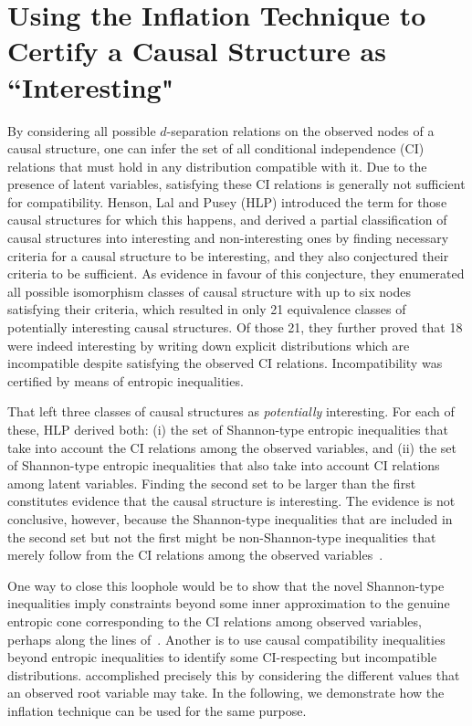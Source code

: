 \documentclass[aps,english,10pt,superscriptaddress,onecolumn,twoside,longbibliography,pra,floatfix,fleqn,nofootinbib]{revtex4-1}
\newcommand*{\tblue}[1]{{\color{medblue}{\textbf{#1}}}}
\theoremstyle{definition}
\begin{document}
\section{Using the Inflation Technique to Certify a Causal Structure as ``Interesting"\label{sec:interestingproof}}

By considering all possible $d$-separation relations on the observed nodes of a causal structure, one can infer the set of all conditional independence (CI) relations that must hold in any distribution compatible with it. Due to the presence of latent variables, satisfying these CI relations 
is generally not sufficient for compatibility. Henson, Lal and Pusey (HLP) \cite{pusey2014gdag} introduced the term \tblue{interesting} for those causal structures for which this happens, and derived a partial classification of causal structures into interesting and non-interesting ones by
finding necessary criteria for a causal structure to be interesting, and they also conjectured their criteria to be sufficient. As evidence in favour of this conjecture, they enumerated all possible isomorphism classes of causal structure with up to six nodes satisfying their criteria, which resulted in only 21 equivalence classes of potentially interesting causal structures. Of those 21, they further proved that 18 were indeed interesting by writing down explicit distributions which are incompatible despite satisfying the observed CI relations. Incompatibility was certified by means of entropic inequalities. 

That left three classes of causal structures  as \emph{potentially} interesting. For each of these, HLP
 derived both: (i) the set of Shannon-type entropic inequalities that take into account the CI relations among the observed variables, and (ii)  the set of Shannon-type entropic inequalities that also take into account CI relations among latent variables.
Finding the second set to be larger than the first constitutes evidence that the causal structure is interesting.
The evidence is not conclusive, however, because the Shannon-type inequalities that are included in the second set but not the first might be non-Shannon-type inequalities that merely follow from the CI relations among the observed variables~\cite{pusey2014gdag}.

One way to close this loophole would be to show that the novel Shannon-type inequalities imply constraints beyond some inner approximation to the genuine entropic cone corresponding to the CI relations among observed variables, perhaps along the lines of~\cite{weilenmann2016entropic}. Another is to use causal compatibility inequalities beyond entropic inequalities to identify some CI-respecting but incompatible distributions. \citet{pianaar2016interesting} accomplished precisely this
by considering the different values that an observed root variable may take. In the following, we demonstrate how the inflation technique can be used for the same purpose. 
\end{document}
